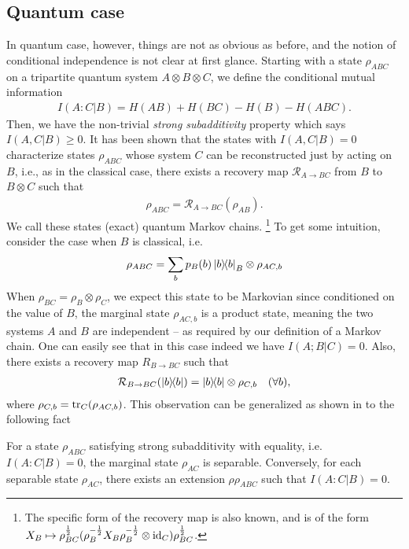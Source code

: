 \documentclass{article}
\begin{document}
 \subsection{Quantum case}
 In quantum case, however, things are not as obvious as before, and the notion of conditional independence is not clear at first glance. Starting with a state $\rho_{ABC}$ on a tripartite quantum system $A\otimes B \otimes C$, we define the conditional mutual information 
 \begin{align} 
 I(A:C|B)=H(AB)+ H(BC)- H(B) - H(ABC). 
 \end{align}
Then, we have the non-trivial \textit{strong subadditivity} property which says $I(A,C|B)\geq 0$. It has been shown \cite{FR15} that the states with $I(A,C|B)=0$ characterize states ${\rho}_{ABC}$ whose system $C$ can be reconstructed just by acting on $B$, i.e., as in the classical case, there exists a recovery map $\mathcal{R}_{A\rightarrow BC}$ from $B$ to $B \otimes C$ such that
\begin{align}
	\rho_{ABC}=\mathcal{R}_{A\rightarrow BC}(\rho_{AB}).
\end{align}
We call these states (exact) quantum Markov chains. 
\footnote{The specific form of the recovery map is also known, and is of the form $X_B  \mapsto \rho_{BC}^{\frac{1}{2}}(\rho_B^{-\frac{1}{2}}X_B \rho_B^{-\frac{1}{2}}\otimes \operatorname{id}_C)\rho_{BC}^{\frac{1}{2}}$.}
To get some intuition, consider the case when $B$ is classical, i.e. 
\begin{align}
	 \rho_{ABC}=\sum_b p_B(b) \ketbra{b}{b}_B \otimes \rho_{AC,b}
\end{align}
When $\rho_{BC}=\rho_{B}\otimes \rho_{C}$, we expect this state to be Markovian since conditioned on the value of $B$, the marginal state $\rho_{AC,b}$ is a product state, meaning the two systems $A$ and $B$ are independent -- as required by our definition of a Markov chain. One can easily see that in this case indeed we have $I(A;B|C)=0$. Also, there exists a recovery map $R_{B\rightarrow BC}$ such that 
\begin{align}
	\mathcal{R}_{B\rightarrow BC} (\ketbra{b}{b}) = \ketbra{b}{b} \otimes  \rho_{C,b}  \quad (\forall b),
\end{align}
where $\rho_{C,b}=\tr_C(\rho_{AC,b})$. 
This observation can be generalized as shown in \cite{FR15} to the following fact
\begin{thm}
	For a state $\rho_{ABC}$ satisfying strong subadditivity with equality, i.e. $I(A : C|B)=0$, the marginal state $\rho_{AC}$ is separable. Conversely, for each separable state $\rho_{AC}$, there exists an extension $ρ\rho_{ABC}$ such that $I(A : C|B) = 0$.
\end{thm}
\end{document}
